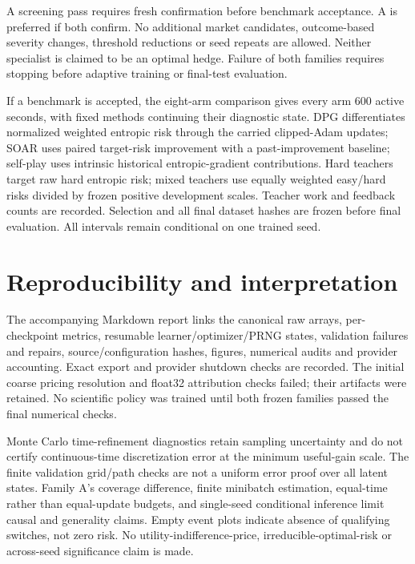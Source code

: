 A screening pass requires fresh confirmation before benchmark acceptance. A is preferred if both confirm. No additional market candidates, outcome-based severity changes, threshold reductions or seed repeats are allowed. Neither specialist is claimed to be an optimal hedge. Failure of both families requires stopping before adaptive training or final-test evaluation.

If a benchmark is accepted, the eight-arm comparison gives every arm 600 active seconds, with fixed methods continuing their diagnostic state. DPG differentiates normalized weighted entropic risk through the carried clipped-Adam updates; SOAR uses paired target-risk improvement with a past-improvement baseline; self-play uses intrinsic historical entropic-gradient contributions. Hard teachers target raw hard entropic risk; mixed teachers use equally weighted easy/hard risks divided by frozen positive development scales. Teacher work and feedback counts are recorded. Selection and all final dataset hashes are frozen before final evaluation. All intervals remain conditional on one trained seed.

\section*{Reproducibility and interpretation}
The accompanying Markdown report links the canonical raw arrays, per-checkpoint metrics, resumable learner/optimizer/PRNG states, validation failures and repairs, source/configuration hashes, figures, numerical audits and provider accounting. Exact export and provider shutdown checks are recorded. The initial coarse pricing resolution and float32 attribution checks failed; their artifacts were retained. No scientific policy was trained until both frozen families passed the final numerical checks.

Monte Carlo time-refinement diagnostics retain sampling uncertainty and do not certify continuous-time discretization error at the minimum useful-gain scale. The finite validation grid/path checks are not a uniform error proof over all latent states. Family A's coverage difference, finite minibatch estimation, equal-time rather than equal-update budgets, and single-seed conditional inference limit causal and generality claims. Empty event plots indicate absence of qualifying switches, not zero risk. No utility-indifference-price, irreducible-optimal-risk or across-seed significance claim is made.
